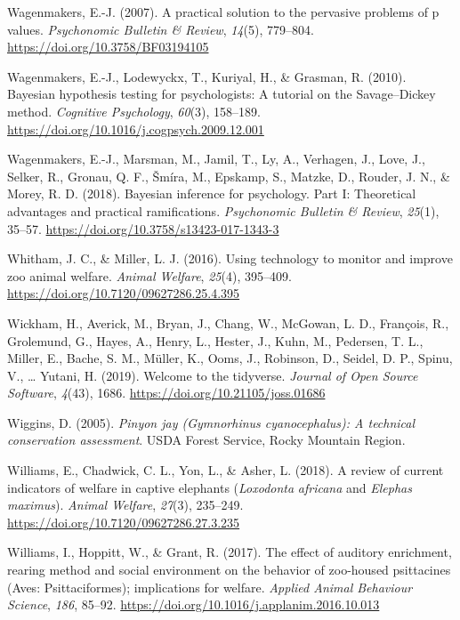 \documentclass[
  pub]{apa6}
\newlength{\cslhangindent}
\newenvironment{CSLReferences}[2] %
 {\begin{list}{}{%
  \setlength{\itemindent}{0pt}
  \setlength{\leftmargin}{0pt}
  \setlength{\parsep}{0pt}
  \ifodd #1
   \setlength{\leftmargin}{\cslhangindent}
   \setlength{\itemindent}{-1\cslhangindent}
  \fi
  \setlength{\itemsep}{#2\baselineskip}}}
 {\end{list}}
\begin{document}
\begin{CSLReferences}{1}{0}
Wagenmakers, E.-J. (2007). A practical solution to the pervasive problems of p values. \emph{Psychonomic Bulletin \& Review}, \emph{14}(5), 779--804. \url{https://doi.org/10.3758/BF03194105}

Wagenmakers, E.-J., Lodewyckx, T., Kuriyal, H., \& Grasman, R. (2010). Bayesian hypothesis testing for psychologists: {A} tutorial on the {Savage}--{Dickey} method. \emph{Cognitive Psychology}, \emph{60}(3), 158--189. \url{https://doi.org/10.1016/j.cogpsych.2009.12.001}

Wagenmakers, E.-J., Marsman, M., Jamil, T., Ly, A., Verhagen, J., Love, J., Selker, R., Gronau, Q. F., Šmíra, M., Epskamp, S., Matzke, D., Rouder, J. N., \& Morey, R. D. (2018). Bayesian inference for psychology. {Part I}: {Theoretical} advantages and practical ramifications. \emph{Psychonomic Bulletin \& Review}, \emph{25}(1), 35--57. \url{https://doi.org/10.3758/s13423-017-1343-3}

Whitham, J. C., \& Miller, L. J. (2016). Using technology to monitor and improve zoo animal welfare. \emph{Animal Welfare}, \emph{25}(4), 395--409. \url{https://doi.org/10.7120/09627286.25.4.395}

Wickham, H., Averick, M., Bryan, J., Chang, W., McGowan, L. D., François, R., Grolemund, G., Hayes, A., Henry, L., Hester, J., Kuhn, M., Pedersen, T. L., Miller, E., Bache, S. M., Müller, K., Ooms, J., Robinson, D., Seidel, D. P., Spinu, V., \ldots{} Yutani, H. (2019). Welcome to the {tidyverse}. \emph{Journal of Open Source Software}, \emph{4}(43), 1686. \url{https://doi.org/10.21105/joss.01686}

Wiggins, D. (2005). \emph{Pinyon jay ({\emph{Gymnorhinus}}{ \emph{cyanocephalus}}): {A} technical conservation assessment}. USDA Forest Service, Rocky Mountain Region.

Williams, E., Chadwick, C. L., Yon, L., \& Asher, L. (2018). A review of current indicators of welfare in captive elephants ({\emph{Loxodonta}}{ \emph{africana}} and {\emph{Elephas}}{ \emph{maximus}}). \emph{Animal Welfare}, \emph{27}(3), 235--249. \url{https://doi.org/10.7120/09627286.27.3.235}

Williams, I., Hoppitt, W., \& Grant, R. (2017). The effect of auditory enrichment, rearing method and social environment on the behavior of zoo-housed psittacines ({Aves}: {Psittaciformes}); implications for welfare. \emph{Applied Animal Behaviour Science}, \emph{186}, 85--92. \url{https://doi.org/10.1016/j.applanim.2016.10.013}


\end{CSLReferences}
\end{document}

